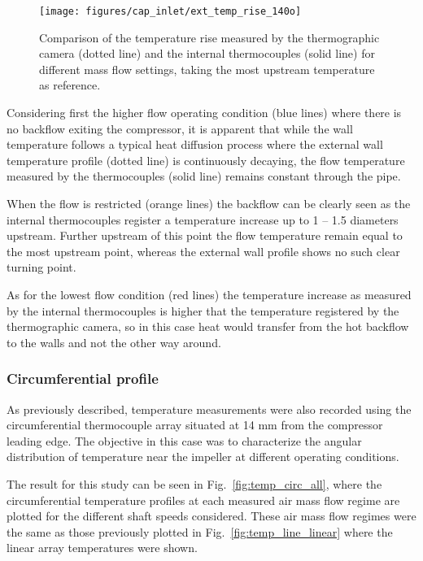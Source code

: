 \begin{figure}[!hbt]
\centering
\texttt{[image: figures/cap\_inlet/ext\_temp\_rise\_140o]}
\caption[Comparison of external vs. internal temperatures]{Comparison of the temperature rise measured by the thermographic camera (dotted line) and the internal thermocouples (solid line) for different mass flow settings, taking the most upstream temperature as reference.}
\label{fig:temp_ext_comp}
\end{figure}

Considering first the higher flow operating condition (blue lines) where there is no backflow exiting the compressor, it is apparent that while the wall temperature follows a typical heat diffusion process where the external wall temperature profile (dotted line) is continuously decaying, the flow temperature measured by the thermocouples (solid line) remains constant through the pipe.

When the flow is restricted (orange lines) the backflow can be clearly seen as the internal thermocouples register a temperature increase up to 1 -- 1.5 diameters upstream. Further upstream of this point the flow temperature remain equal to the most upstream point, whereas the external wall profile shows no such clear turning point.

As for the lowest flow condition (red lines) the temperature increase as measured by the internal thermocouples is higher that the temperature registered by the thermographic camera, so in this case heat would transfer from the hot backflow to the walls and not the other way around.

\subsubsection{Circumferential profile}

As previously described, temperature measurements were also recorded using the circumferential thermocouple array situated at 14 mm from the compressor leading edge. The objective in this case was to characterize the angular distribution of temperature near the impeller at different operating conditions.

The result for this study can be seen in Fig.~\ref{fig:temp_circ_all}, where the circumferential temperature profiles at each measured air mass flow regime are plotted for the different shaft speeds considered. These air mass flow regimes were the same as those previously plotted in Fig.~\ref{fig:temp_line_linear} where the linear array temperatures were shown.

